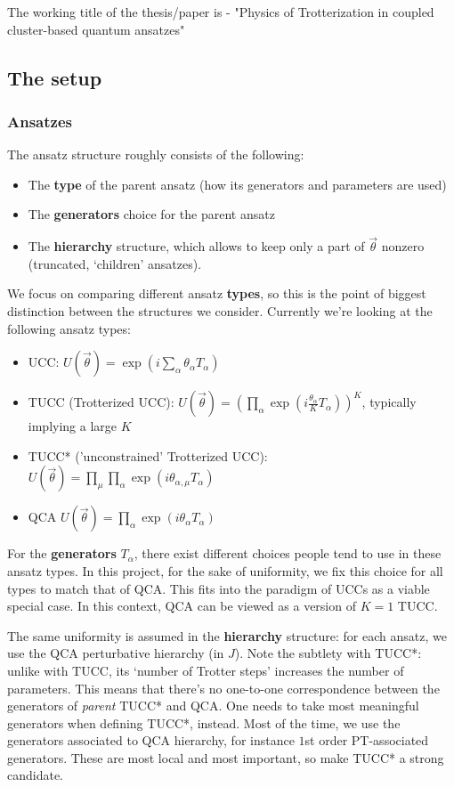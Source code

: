 \documentclass[10pt, a4paper]{article}
\begin{document}
The working title of the thesis/paper is - "Physics of Trotterization in coupled cluster-based quantum ansatzes"

\subsection*{The setup}

\subsubsection*{Ansatzes}

The ansatz structure roughly consists of the following:

\begin{itemize}
\item The \textbf{type} of the parent ansatz (how its generators and parameters are used)
\item The \textbf{generators} choice for the parent ansatz
\item The \textbf{hierarchy} structure, which allows to keep only a part of $\vec{\theta}$ nonzero (truncated, `children' ansatzes).
\end{itemize}

We focus on comparing different ansatz \textbf{types}, so this is the point of biggest distinction between the structures we consider. Currently we're looking at the following ansatz types:

\begin{itemize}
\item UCC: $U(\vec{\theta})=\exp(i\sum_{\alpha}\theta_{\alpha}T_\alpha)$
\item TUCC (Trotterized UCC): $U(\vec{\theta})=(\prod_{\alpha}\exp(i\frac{\theta_{\alpha}}{K}T_\alpha))^K$, typically implying a large $K$
\item TUCC* ('unconstrained' Trotterized UCC): $U(\vec{\theta})=\prod_{\mu}\prod_{\alpha}\exp(i\theta_{\alpha,\mu}T_\alpha)$
\item QCA $U(\vec{\theta})=\prod_{\alpha}\exp(i\theta_{\alpha}T_\alpha)$
\end{itemize}

For the \textbf{generators} $T_{\alpha}$, there exist different choices people tend to use in these ansatz types. In this project, for the sake of uniformity, we fix this choice for all types to match that of QCA. This fits into the paradigm of UCCs as a viable special case. In this context, QCA can be viewed as a version of $K=1$ TUCC.

The same uniformity is assumed in the \textbf{hierarchy} structure: for each ansatz, we use the QCA perturbative hierarchy (in $J$). Note the subtlety with TUCC*: unlike with TUCC, its `number of Trotter steps' increases the number of parameters. This means that there's no one-to-one correspondence between the generators of \textit{parent} TUCC* and QCA. One needs to take most meaningful generators when defining TUCC*, instead. Most of the time, we use the generators associated to QCA hierarchy, for instance $1$st order PT-associated generators. These are most local and most important, so make TUCC* a strong candidate.
\end{document}
